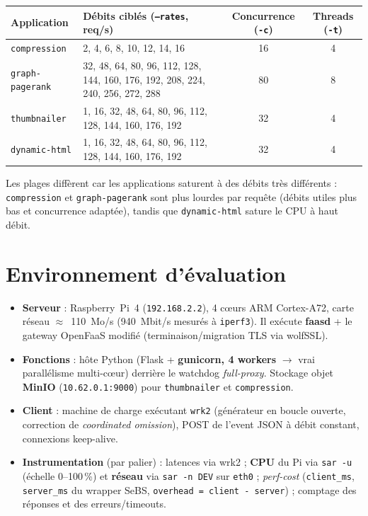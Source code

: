 \documentclass[10pt,a4paper]{article}
\newcommand{\code}[1]{\texttt{\small #1}}
\begin{document}
\begin{center}\small
\begin{tabular}{@{}lp{6.6cm}cc@{}}
\toprule
\textbf{Application} & \textbf{Débits ciblés (\code{--rates}, req/s)} & \textbf{Concurrence (\code{-c})} & \textbf{Threads (\code{-t})} \\
\midrule
\code{compression}    & 2, 4, 6, 8, 10, 12, 14, 16                                   & 16 & 4 \\
\code{graph-pagerank} & 32, 48, 64, 80, 96, 112, 128, 144, 160, 176, 192, 208, 224, 240, 256, 272, 288 & 80 & 8 \\
\code{thumbnailer}    & 1, 16, 32, 48, 64, 80, 96, 112, 128, 144, 160, 176, 192      & 32 & 4 \\
\code{dynamic-html}   & 1, 16, 32, 48, 64, 80, 96, 112, 128, 144, 160, 176, 192      & 32 & 4 \\
\bottomrule
\end{tabular}
\end{center}
Les plages diffèrent car les applications saturent à des débits très différents : \code{compression}
et \code{graph-pagerank} sont plus lourdes par requête (débits utiles plus bas et concurrence adaptée),
tandis que \code{dynamic-html} sature le CPU à haut débit.

\section{Environnement d'évaluation}
\begin{itemize}
\item \textbf{Serveur} : Raspberry~Pi~4 (\code{192.168.2.2}), 4 c\oe{}urs ARM Cortex-A72, carte réseau
$\approx$~110~Mo/s (940~Mbit/s mesurés à \code{iperf3}). Il exécute \textbf{faasd} + le gateway OpenFaaS
modifié (terminaison/migration TLS via wolfSSL).
\item \textbf{Fonctions} : hôte Python (Flask + \textbf{gunicorn, 4 workers} $\rightarrow$ vrai
parallélisme multi-c\oe{}ur) derrière le watchdog \emph{full-proxy}. Stockage objet \textbf{MinIO}
(\code{10.62.0.1:9000}) pour \code{thumbnailer} et \code{compression}.
\item \textbf{Client} : machine de charge exécutant \code{wrk2} (générateur en boucle ouverte, correction
de \emph{coordinated omission}), POST de l'event JSON à débit constant, connexions keep-alive.
\item \textbf{Instrumentation} (par palier) : latences via wrk2 ; \textbf{CPU} du Pi via \code{sar -u}
(échelle 0--100\,\%) et \textbf{réseau} via \code{sar -n DEV} sur \code{eth0} ; \emph{perf-cost}
(\code{client\_ms}, \code{server\_ms} du wrapper SeBS, \code{overhead = client - server}) ; comptage des
réponses et des erreurs/timeouts.
\end{itemize}
\end{document}
